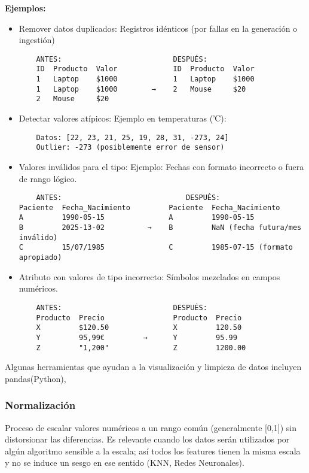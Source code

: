 \documentclass[12pt]{book}
\begin{document}
\textbf{Ejemplos:} 
\begin{itemize}
    \item Remover datos duplicados: Registros idénticos (por fallas en la generación o ingestión)
    \begin{verbatim}
    ANTES:                          DESPUÉS:
    ID  Producto  Valor             ID  Producto  Valor
    1   Laptop    $1000             1   Laptop    $1000
    1   Laptop    $1000        →    2   Mouse     $20
    2   Mouse     $20
    \end{verbatim}

    \item Detectar valores atípicos: Ejemplo en temperaturas (℃):
    \begin{verbatim}
    Datos: [22, 23, 21, 25, 19, 28, 31, -273, 24]
    Outlier: -273 (posiblemente error de sensor) 
    \end{verbatim} %
    
    \item Valores inválidos para el tipo: Ejemplo: Fechas con formato incorrecto o fuera de rango lógico.
    \begin{verbatim}
    ANTES:                             DESPUÉS:
Paciente  Fecha_Nacimiento         Paciente  Fecha_Nacimiento
A         1990-05-15               A         1990-05-15
B         2025-13-02          →    B         NaN (fecha futura/mes inválido)
C         15/07/1985               C         1985-07-15 (formato apropiado)
    \end{verbatim}
    
    \item Atributo con valores de tipo incorrecto: Símbolos mezclados en campos numéricos.
    \begin{verbatim}
    ANTES:                          DESPUÉS:
    Producto  Precio                Producto  Precio
    X         $120.50               X         120.50
    Y         95,99€         →      Y         95.99 
    Z         "1,200"               Z         1200.00
    \end{verbatim}
\end{itemize}
Algunas herramientas que ayudan a la visualización y limpieza de datos incluyen pandas(Python), 

\subsubsection{Normalización}
Proceso de escalar valores numéricos a un rango común (generalmente [0,1]) sin distorsionar las diferencias. Es 
relevante cuando los datos serán utilizados por algún algoritmo sensible a la escala; así todos los features tienen 
la misma escala y no se induce un sesgo en ese sentido (KNN, Redes Neuronales).\\
\end{document}
